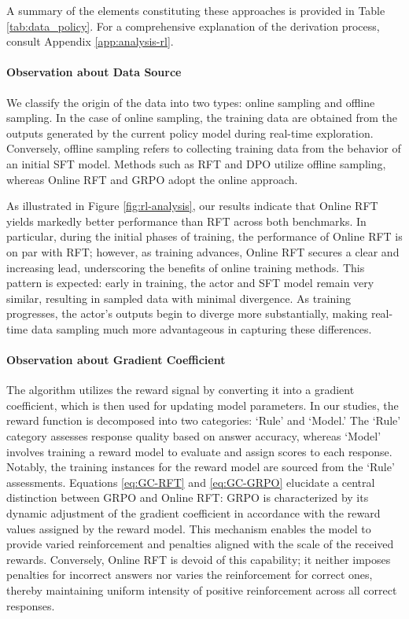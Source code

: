 \begin{itemize}[topsep=0pt]
A summary of the elements constituting these approaches is provided in Table \ref{tab:data_policy}. For a comprehensive explanation of the derivation process, consult Appendix \ref{app:analysis-rl}.

\paragraph{Observation about Data Source} We classify the origin of the data into two types: online sampling and offline sampling. In the case of online sampling, the training data are obtained from the outputs generated by the current policy model during real-time exploration. Conversely, offline sampling refers to collecting training data from the behavior of an initial SFT model. Methods such as RFT and DPO utilize offline sampling, whereas Online RFT and GRPO adopt the online approach.

As illustrated in Figure \ref{fig:rl-analysis}, our results indicate that Online RFT yields markedly better performance than RFT across both benchmarks. In particular, during the initial phases of training, the performance of Online RFT is on par with RFT; however, as training advances, Online RFT secures a clear and increasing lead, underscoring the benefits of online training methods. This pattern is expected: early in training, the actor and SFT model remain very similar, resulting in sampled data with minimal divergence. As training progresses, the actor's outputs begin to diverge more substantially, making real-time data sampling much more advantageous in capturing these differences.

\paragraph{Observation about Gradient Coefficient} The algorithm utilizes the reward signal by converting it into a gradient coefficient, which is then used for updating model parameters. In our studies, the reward function is decomposed into two categories: `Rule' and `Model.' The `Rule' category assesses response quality based on answer accuracy, whereas `Model' involves training a reward model to evaluate and assign scores to each response. Notably, the training instances for the reward model are sourced from the `Rule' assessments. Equations \ref{eq:GC-RFT} and \ref{eq:GC-GRPO} elucidate a central distinction between GRPO and Online RFT: GRPO is characterized by its dynamic adjustment of the gradient coefficient in accordance with the reward values assigned by the reward model. This mechanism enables the model to provide varied reinforcement and penalties aligned with the scale of the received rewards. Conversely, Online RFT is devoid of this capability; it neither imposes penalties for incorrect answers nor varies the reinforcement for correct ones, thereby maintaining uniform intensity of positive reinforcement across all correct responses.


\end{itemize}

